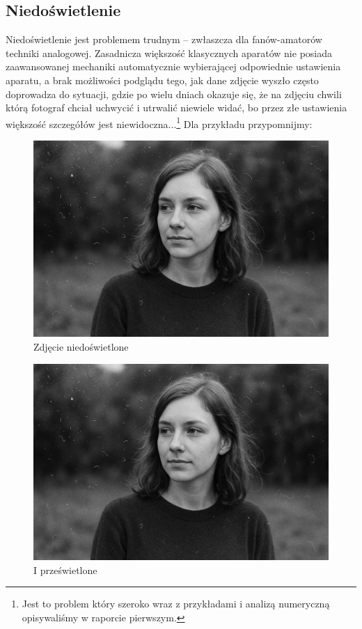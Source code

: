 \documentclass[]{mwart}
\begin{document}
\subsection{Niedoświetlenie} %
Niedoświetlenie jest problemem trudnym -- zwłaszcza dla fanów-amatorów techniki analogowej.
Zasadnicza większość klasycznych aparatów nie posiada zaawansowanej mechaniki automatycznie wybierającej
odpowiednie ustawienia aparatu, a brak możliwości podglądu tego, jak dane zdjęcie wyszło często doprowadza
do sytuacji, gdzie po wielu dniach okazuje się, że na zdjęciu chwili którą fotograf chciał uchwycić i utrwalić
niewiele widać, bo przez złe ustawienia większość szczegółów jest niewidoczna...\footnote{Jest to problem który szeroko
    wraz z przykładami i analizą numeryczną opisywaliśmy w raporcie pierwszym.}
Dla przykładu przypomnijmy:
\newpage
\begin{figure}[H]
    \centering
    \includegraphics[width=\linewidth, keepaspectratio]{p_1.jpg}
    \caption{Zdjęcie niedoświetlone}
\end{figure}
\begin{figure}[H]
    \centering
    \includegraphics[width=\linewidth, keepaspectratio]{p_1.jpg}
    \caption{I prześwietlone}
\end{figure}
\end{document}
